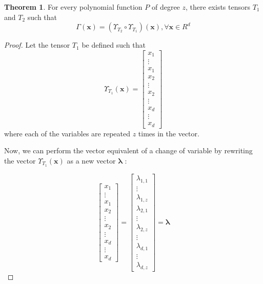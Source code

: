 \documentclass{article}
\theoremstyle{definition}
\newtheorem{theorem}{Theorem}[section]
\theoremstyle{definition}
\begin{document}
\begin{theorem}
    For every polynomial function $P$ of degree $z$, there exists tensors $T_1$ and $T_2$ such that
    \[ \Gamma(\mathbf{x}) = \left(\Upsilon_{T_2} \circ \Upsilon_{T_1}\right) (\mathbf{x}), \forall \mathbf{x} \in R^d\]
\end{theorem}

\begin{proof}
Let the tensor $T_1$ be defined such that
\begin{equation}
    \Upsilon_{T_1}(\mathbf{x})
    = 
    \begin{bmatrix}
            x_1   \\
            \vdots  \\
            x_1 \\
            x_2 \\
            \vdots \\
            x_2 \\
            \vdots \\
            x_d  \\
            \vdots  \\
            x_d 
    \end{bmatrix}
\end{equation}
where each of the variables are repeated $z$ times in the vector.

Now, we can perform the vector equivalent of a change of variable by rewriting the vector $\Upsilon_{T_1}(\mathbf{x})$ as a new vector $\bm{\lambda}$ :

\begin{equation} \label{lambda}
    \begin{bmatrix}
        x_1   \\
        \vdots  \\
        x_1 \\
        x_2 \\
        \vdots \\
        x_2 \\
        \vdots \\
        x_d   \\
        \vdots  \\
        x_d
\end{bmatrix}
    =
    \begin{bmatrix}
        \lambda_{1, 1} \\
        \vdots \\
        \lambda_{1, z} \\
        \lambda_{2, 1} \\
        \vdots \\
        \lambda_{2, z} \\
        \vdots \\
        \lambda_{d, 1} \\
        \vdots \\
        \lambda_{d, z} 
    \end{bmatrix}
    = \bm{\lambda}
\end{equation}


\end{proof}
\end{document}
